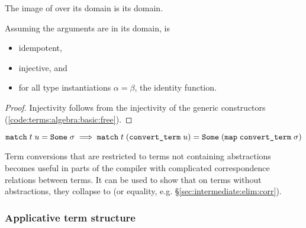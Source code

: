 \begin{lemma}
  The image of  over its domain is its domain.
\end{lemma}

\begin{lemma}
  Assuming the arguments are in its domain,  is
  \begin{itemize}
    \item idempotent,
    \item injective, and
    \item for all type instantiations $\alpha = \beta$, the identity function.
  \end{itemize}
\end{lemma}

\begin{proof}
  Injectivity follows from the injectivity of the generic constructors (\cref{code:terms:algebra:basic:free}).
\end{proof}

\begin{lemma}\label{thm:terms:algebra:match-convert}
  \[ \texttt{\textup{match}}\;t\;u = \texttt{\textup{Some}}\;\sigma \implies \texttt{\textup{match}}\;t\;(\texttt{\textup{convert\_term}}\;u) = \texttt{\textup{Some}}\;(\texttt{\textup{map}}\;\texttt{\textup{convert\_term}}\;\sigma) \]
\end{lemma}

\noindent
Term conversions that are restricted to terms not containing abstractions becomes useful in parts of the compiler with complicated correspondence relations between terms.
It can be used to show that on terms without abstractions, they collapse to  (or equality, e.g. §\ref{sec:intermediate:elim:corr}).

\subsubsection{Applicative term structure}
\label{sec:terms:algebra:thy:applicative}


